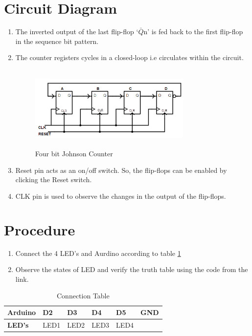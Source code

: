 \documentclass[journal,12pt,twocolumn]{IEEEtran}
\begin{document}
    \vspace{2.5cm}   



\section{Circuit Diagram}
\begin{enumerate}
\item The inverted output of the last flip-flop ‘$\bar{Q}$n’ is fed back to the first flip-flop in the sequence bit pattern. 
\item The counter registers cycles in a closed-loop i.e circulates within the circuit.
\begin{figure}[h]
    \centering
    \includegraphics[width=8cm, height=4.2cm]{counter.jpg}
    
    \caption{Four bit Johnson Counter}

\end{figure}
\item Reset pin acts as an on/off switch. So, the flip-flops can be enabled by clicking the Reset switch.

\item CLK pin is used to observe the changes in the output of the flip-flops.
\end{enumerate}



\section{Procedure}
\begin{enumerate}
\item Connect the 4 LED's and Aurdino according to table \ref{table:1}
\item Observe the states of LED and verify the truth table using the code from the link.



\end{enumerate}

\begin{table}[h]
\centering
\large
\begin{tabular}{|l|l|l|l|l|l|}
\hline
\textbf{Arduino} & D2   & D3   & D4   & D5   & GND \\ \hline
\textbf{LED's}   & LED1 & LED2 & LED3 & LED4 &     \\ \hline
\end{tabular}
\caption{Connection Table}
\label{table:1}
\end{table} 
\end{document}
